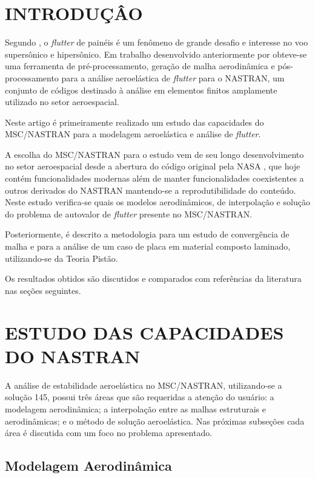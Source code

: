 \section{INTRODUÇÂO}

Segundo \cite{pegado_flutter_2006}, o \emph{flutter} de painéis é um
fenômeno de grande desafio e interesse no voo supersônico e 
hipersônico. Em trabalho desenvolvido anteriormente por 
\cite{santos_finite_2019}
obteve-se uma ferramenta de 
pré-processamento, geração de malha aerodinâmica e pós-processamento
para a análise aeroelástica de \emph{flutter} para o NASTRAN, um 
conjunto de códigos destinado à análise em elementos finitos 
amplamente utilizado no setor aeroespacial.

Neste artigo é primeiramente realizado um estudo das capacidades do 
MSC/NASTRAN para a modelagem 
aeroelástica e análise de \emph{flutter}.

A escolha do MSC/NASTRAN para o estudo vem de seu longo 
desenvolvimento no setor aeroespacial desde a abertura do código 
original pela NASA \citep[p. 1]{macneal_organizational_1974}, que 
hoje contém funcionalidades modernas além de
manter funcionalidades coexistentes a outros derivados do NASTRAN 
mantendo-se a reprodutibilidade do conteúdo.
Neste estudo verifica-se quais os modelos aerodinâmicos, de 
interpolação e solução do problema de autovalor de \emph{flutter} 
presente no MSC/NASTRAN.

Posteriormente, é descrito a metodologia para um estudo de 
convergência de malha e para a análise de
um caso de placa em material composto laminado, utilizando-se da Teoria Pistão.

Os resultados obtidos são discutidos e 
comparados com referências da literatura nas seções seguintes.


\section{ESTUDO DAS CAPACIDADES DO NASTRAN}

A análise de estabilidade aeroelástica no MSC/NASTRAN, utilizando-se a solução 145, possui três áreas que são requeridas a atenção do usuário: a modelagem aerodinâmica; a interpolação entre as malhas estruturais e aerodinâmicas; e o método de solução aeroelástica. Nas próximas subseções cada área é discutida com um foco no problema apresentado.

\subsection{Modelagem Aerodinâmica}

